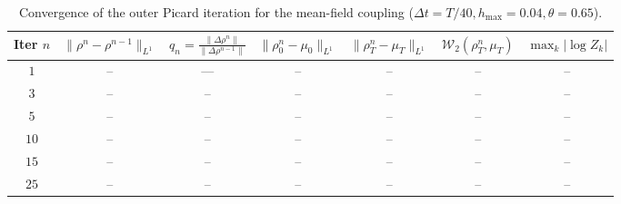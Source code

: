 \documentclass[10pt,a4paper]{article}
\begin{document}
\begin{table}[htbp]
\centering
\small
\caption{Convergence of the outer Picard iteration for the mean-field coupling ($\Delta t = T/40, h_{\max} = 0.04, \theta = 0.65$).}
\label{tab:picard_convergence}
\begin{tabular}{ccccccc}
\toprule
Iter $n$ & $\|\rho^n - \rho^{n-1}\|_{L^1}$ & $q_n = \frac{\|\Delta \rho^n\|}{\|\Delta \rho^{n-1}\|}$ & $\|\rho_0^n - \mu_0\|_{L^1}$ & $\|\rho_T^n - \mu_T\|_{L^1}$ & $\mathcal{W}_2(\rho_T^n, \mu_T)$ & $\max_k |\log Z_k|$ \\
\midrule
$1$  & -- & --- & -- & -- & -- & -- \\
$3$  & -- & --  & -- & -- & -- & -- \\
$5$  & -- & --  & -- & -- & -- & -- \\
$10$ & -- & --  & -- & -- & -- & -- \\
$15$ & -- & --  & -- & -- & -- & -- \\
$25$ & -- & --  & -- & -- & -- & -- \\
\bottomrule
\end{tabular}
\end{table}



\clearpage



\end{document}
